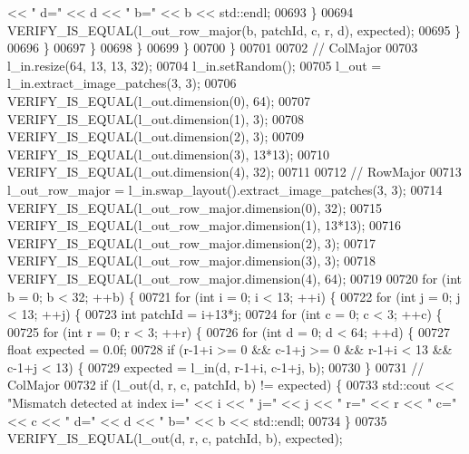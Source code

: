 \begin{DoxyCode}
       << \textcolor{stringliteral}{" d="} << d << \textcolor{stringliteral}{" b="} << b << std::endl;
00693               \}
00694               VERIFY\_IS\_EQUAL(l\_out\_row\_major(b, patchId, c, r, d), expected);
00695             \}
00696           \}
00697         \}
00698       \}
00699     \}
00700   \}
00701 
00702   \textcolor{comment}{// ColMajor}
00703   l\_in.resize(64, 13, 13, 32);
00704   l\_in.setRandom();
00705   l\_out = l\_in.extract\_image\_patches(3, 3);
00706   VERIFY\_IS\_EQUAL(l\_out.dimension(0), 64);
00707   VERIFY\_IS\_EQUAL(l\_out.dimension(1), 3);
00708   VERIFY\_IS\_EQUAL(l\_out.dimension(2), 3);
00709   VERIFY\_IS\_EQUAL(l\_out.dimension(3), 13*13);
00710   VERIFY\_IS\_EQUAL(l\_out.dimension(4), 32);
00711 
00712   \textcolor{comment}{// RowMajor}
00713   l\_out\_row\_major = l\_in.swap\_layout().extract\_image\_patches(3, 3);
00714   VERIFY\_IS\_EQUAL(l\_out\_row\_major.dimension(0), 32);
00715   VERIFY\_IS\_EQUAL(l\_out\_row\_major.dimension(1), 13*13);
00716   VERIFY\_IS\_EQUAL(l\_out\_row\_major.dimension(2), 3);
00717   VERIFY\_IS\_EQUAL(l\_out\_row\_major.dimension(3), 3);
00718   VERIFY\_IS\_EQUAL(l\_out\_row\_major.dimension(4), 64);
00719 
00720   \textcolor{keywordflow}{for} (\textcolor{keywordtype}{int} b = 0; b < 32; ++b) \{
00721     \textcolor{keywordflow}{for} (\textcolor{keywordtype}{int} i = 0; i < 13; ++i) \{
00722       \textcolor{keywordflow}{for} (\textcolor{keywordtype}{int} j = 0; j < 13; ++j) \{
00723         \textcolor{keywordtype}{int} patchId = i+13*j;
00724         \textcolor{keywordflow}{for} (\textcolor{keywordtype}{int} c = 0; c < 3; ++c) \{
00725           \textcolor{keywordflow}{for} (\textcolor{keywordtype}{int} r = 0; r < 3; ++r) \{
00726             \textcolor{keywordflow}{for} (\textcolor{keywordtype}{int} d = 0; d < 64; ++d) \{
00727               \textcolor{keywordtype}{float} expected = 0.0f;
00728               \textcolor{keywordflow}{if} (r-1+i >= 0 && c-1+j >= 0 && r-1+i < 13 && c-1+j < 13) \{
00729                 expected = l\_in(d, r-1+i, c-1+j, b);
00730               \}
00731               \textcolor{comment}{// ColMajor}
00732               \textcolor{keywordflow}{if} (l\_out(d, r, c, patchId, b) != expected) \{
00733                 std::cout << \textcolor{stringliteral}{"Mismatch detected at index i="} << i << \textcolor{stringliteral}{" j="} << j << \textcolor{stringliteral}{" r="} << r << \textcolor{stringliteral}{" c="} << c
       << \textcolor{stringliteral}{" d="} << d << \textcolor{stringliteral}{" b="} << b << std::endl;
00734               \}
00735               VERIFY\_IS\_EQUAL(l\_out(d, r, c, patchId, b), expected);

\end{DoxyCode}
